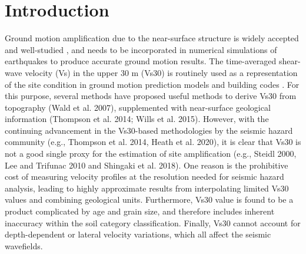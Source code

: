 \section{Introduction} \label{vs30:intro}
Ground motion amplification due to the near-surface structure is widely accepted and well-studied \citep{gilbertSanFranciscoEarthquake1907,fieldModifiedGroundMotionAttenuation2000}, and needs to be incorporated in numerical  simulations of earthquakes to produce accurate ground motion results. The time-averaged shear-wave velocity (Vs) in the upper 30 m (Vs30) is routinely used as a representation of the site condition in ground motion prediction models and building codes \citep{borcherdtEstimatesSiteDependentResponse1994,bozorgniaNGAWest2ResearchProject2014,internationalcodecouncil2015IBCInternational2014}. For this purpose, several methods have proposed useful methods to derive Vs30 from topography (Wald et al. 2007), supplemented with near-surface geological information (Thompson et al. 2014; Wills et al. 2015). However, with the continuing advancement in the Vs30-based methodologies by the seismic hazard community (e.g., Thompson et al. 2014, Heath et al. 2020), it is clear  that Vs30 is not a good single proxy for the estimation of site amplification (e.g., Steidl 2000, Lee and Trifunac 2010 and Shingaki et al. 2018). One reason is the prohibitive cost of measuring velocity profiles at the resolution needed for seismic hazard analysis, leading to highly approximate results from interpolating limited Vs30 values and combining geological units. Furthermore, Vs30 value is found to be a product complicated by age and grain size, and therefore includes inherent inaccuracy within the soil category classification. Finally, Vs30 cannot account for depth-dependent or lateral velocity variations,  which all affect the seismic wavefields.

